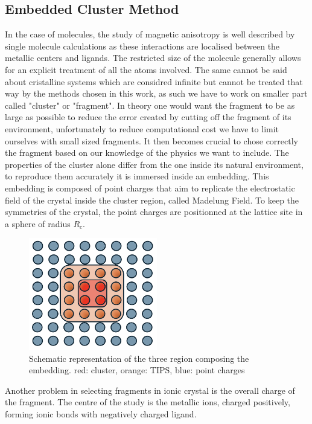 \documentclass[10pt]{report}
\numberwithin{equation}{section}
\begin{document}
\subsection{Embedded Cluster Method}

In the case of molecules, the study of magnetic anisotropy is well described by single molecule calculations as these interactions are localised between the metallic centers and ligands. 
The restricted size of the molecule generally allows for an explicit treatment of all the atoms involved.
The same cannot be said about cristalline systems which are considred infinite but cannot be treated that way by the methods chosen in this work, as such we have to work on smaller part called "cluster" or "fragment".
In theory one would want the fragment to be as large as possible to reduce the error created by cutting off the fragment of its environment, unfortunately to reduce computational cost we have to limit ourselves with small sized fragments. 
It then becomes crucial to chose correctly the fragment based on our knowledge of the physics we want to include.
The properties of the cluster alone differ from the one inside its natural environment, to reproduce them accurately it is immersed inside an embedding. 
This embedding is composed of point charges that aim to replicate the electrostatic field of the crystal inside the cluster region, called Madelung Field. 
To keep the symmetries of the crystal, the point charges are positionned at the lattice site in a sphere of radius $R_c$. 
\begin{figure}[h!]
    \centering
    \includegraphics[width=0.5\textwidth]{Images/Bain.png}
    \caption{Schematic representation of the three region composing the embedding. red: cluster, orange: TIPS, blue: point charges}
    \label{Bain}
\end{figure}
Another problem in selecting fragments in ionic crystal is the overall charge of the fragment.
The centre of the study is the metallic ions, charged positively, forming ionic bonds with negatively charged ligand.
\end{document}
